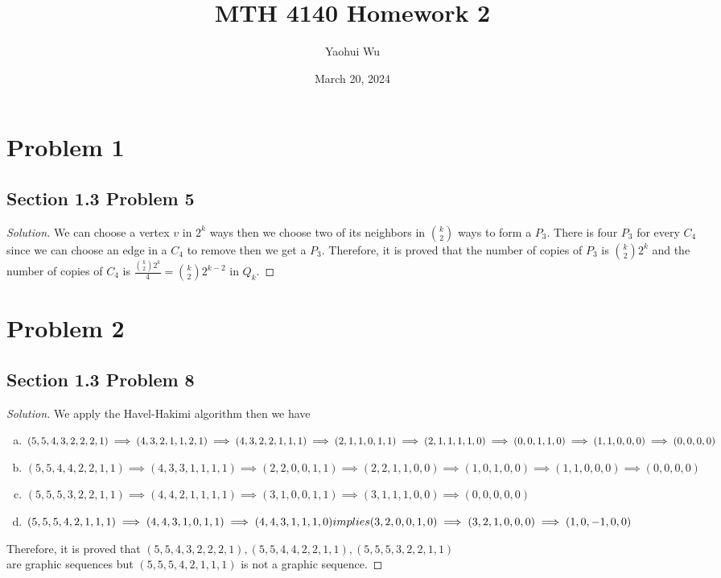 \documentclass[12pt]{article}
\title{MTH 4140 Homework 2}
\author{Yaohui Wu}
\date{March 20, 2024}
\newenvironment*{solution}{\begin{proof}[Solution]}{\end{proof}}
\begin{document}
\maketitle
\section*{Problem 1}
\subsection*{Section 1.3 Problem 5}
\begin{solution}
    We can choose a vertex \(v\) in \(2^k\) ways then we choose two of its
    neighbors in \(\binom{k}{2}\) ways to form a \(P_3\). There is four \(P_3
    \) for every \(C_4\) since we can choose an edge in a \(C_4\) to remove
    then we get a \(P_3\). Therefore, it is proved that the number of copies
    of \(P_3\) is \(\binom{k}{2}2^k\) and the number of copies of \(C_4\) is
    \(\frac{\binom{k}{2}2^k}{4}=\binom{k}{2}2^{k-2}\) in \(Q_k\).
\end{solution}
\section*{Problem 2}
\subsection*{Section 1.3 Problem 8}
\begin{solution}
    We apply the Havel-Hakimi algorithm then we have
    \begin{enumerate}[(a)]
        \item \((5,5,4,3,2,2,2,1)\implies(4,3,2,1,1,2,1)\implies(4,3,2,2,1,1,1
        )\implies(2,1,1,0,1,1) \\ \implies(2,1,1,1,1,0)\implies(0,0,1,1,0)
        \implies(1,1,0,0,0)\implies(0,0,0,0)\)
        \item \((5,5,4,4,2,2,1,1)\implies(4,3,3,1,1,1,1)\implies(2,2,0,0,1,1)
        \implies(2,2,1,1,0,0)\implies(1,0,1,0,0)\implies(1,1,0,0,0)\implies(0,
        0,0,0)\)
        \item \((5,5,5,3,2,2,1,1)\implies(4,4,2,1,1,1,1)\implies(3,1,0,0,1,1)
        \implies(3,1,1,1,0,0)\implies(0,0,0,0,0)\)
        \item \((5,5,5,4,2,1,1,1)\implies(4,4,3,1,0,1,1)\implies(4,4,3,1,1,1,0
        )\ \\ implies(3,2,0,0,1,0)\implies(3,2,1,0,0,0)\implies(1,0,-1,0,0)\)
    \end{enumerate}
    Therefore, it is proved that \((5,5,4,3,2,2,2,1),(5,5,4,4,2,2,1,1),(5,5,5,3
    ,2,2,1,1)\) \\ are graphic sequences but \((5,5,5,4,2,1,1,1)\)  is not a
    graphic sequence.
\end{solution}
\end{document}
